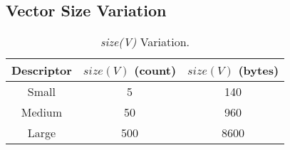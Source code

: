 \documentclass{sig-alternate}
\begin{document}
\subsection{Vector Size Variation}
\label{sec:variation}


\begin{table}[t]
  
  \begin{center}
  \begin{tabular}{| c | c | c |}
  \hline
  Descriptor & $size(V)$ (count) & $size(V)$ (bytes) \\
  \hline
  Small & 5 & 140 \\
  Medium & 50 & 960 \\
  Large & 500 & 8600 \\
  \hline
  \end{tabular}
\end{center}

  \vspace*{-.15in}
  \caption{{\em size(V)} Variation.}
  \label{tab:sizes}

\vspace*{-.2in}
\end{table}




\end{document}
